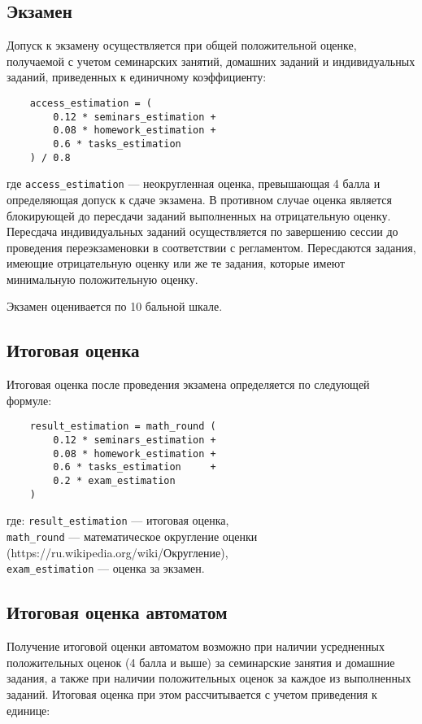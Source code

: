 \documentclass[a4paper, 12pt, oneside]{article}
\begin{document}
\subsection{Экзамен}

Допуск к экзамену осуществляется при общей положительной оценке, получаемой с учетом семинарских занятий, домашних заданий и индивидуальных заданий, приведенных к единичному коэффициенту:

\begin{verbatim}
    access_estimation = (
        0.12 * seminars_estimation +
        0.08 * homework_estimation +
        0.6 * tasks_estimation
    ) / 0.8
\end{verbatim}
где \verb|access_estimation| — неокругленная оценка, превышающая 4 балла и определяющая допуск к сдаче экзамена. В противном случае оценка является блокирующей до пересдачи заданий выполненных на отрицательную оценку. Пересдача индивидуальных заданий осуществляется по завершению сессии до проведения переэкзаменовки в соответствии с регламентом. Пересдаются задания, имеющие отрицательную оценку или же те задания, которые имеют минимальную положительную оценку.

Экзамен оценивается по 10 бальной шкале.

\subsection{Итоговая оценка}

Итоговая оценка после проведения экзамена определяется по следующей формуле:

\begin{verbatim}
    result_estimation = math_round (
        0.12 * seminars_estimation +
        0.08 * homework_estimation +
        0.6 * tasks_estimation     +
        0.2 * exam_estimation
    )
\end{verbatim}
где: \verb|result_estimation| --- итоговая оценка,\\
\verb|math_round| --- математическое округление оценки \\ (https://ru.wikipedia.org/wiki/Округление), \\
\verb|exam_estimation| --- оценка за экзамен.

\subsection{Итоговая оценка автоматом}

Получение итоговой оценки автоматом возможно при наличии усредненных положительных оценок (4 балла и выше) за семинарские занятия и домашние задания, а также при наличии положительных оценок за каждое из выполненных заданий. Итоговая оценка при этом рассчитывается с учетом приведения к единице:
\end{document}
